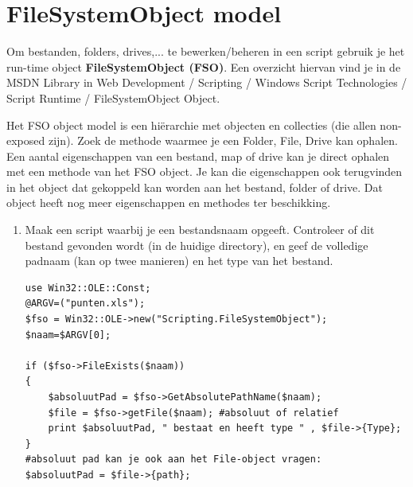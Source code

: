 \documentclass[11pt,a4paper]{report}
\begin{document}
\section{FileSystemObject model}
Om bestanden, folders, drives,... te bewerken/beheren in een script gebruik je het run-time object \textbf{FileSystemObject (FSO)}.
Een overzicht hiervan vind je in de MSDN Library in Web Development / Scripting / Windows Script Technologies / Script Runtime / FileSystemObject Object.
\par Het FSO object model is een hiërarchie met objecten en collecties (die allen non-exposed zijn). Zoek de methode waarmee je een Folder, File, Drive kan ophalen. Een aantal eigenschappen van een bestand, map of drive kan je direct ophalen met een methode van het FSO object. Je kan die eigenschappen ook terugvinden in het object dat gekoppeld kan worden aan het bestand, folder of drive. Dat object heeft nog meer eigenschappen en methodes ter beschikking.
\begin{enumerate}[resume]
	\item Maak een script waarbij je een bestandsnaam opgeeft. Controleer of dit bestand gevonden wordt (in de huidige directory), en geef de volledige padnaam (kan op twee manieren) en het type van het bestand.
\begin{lstlisting}
use Win32::OLE::Const;
@ARGV=("punten.xls");
$fso = Win32::OLE->new("Scripting.FileSystemObject");
$naam=$ARGV[0];

if ($fso->FileExists($naam))
{
	$absoluutPad = $fso->GetAbsolutePathName($naam); 
	$file = $fso->getFile($naam); #absoluut of relatief
	print $absoluutPad, " bestaat en heeft type " , $file->{Type};
}
#absoluut pad kan je ook aan het File-object vragen:    
$absoluutPad = $file->{path};
\end{lstlisting}
\end{enumerate}
\end{document}
